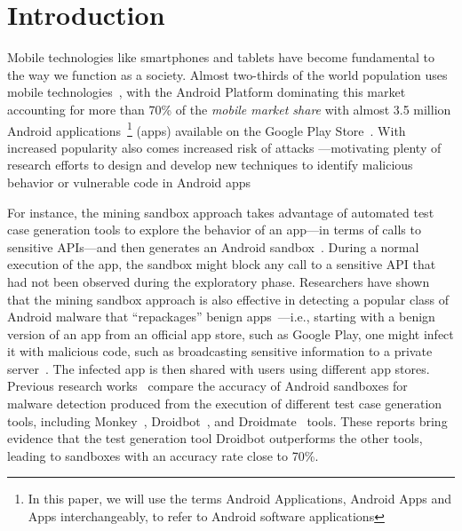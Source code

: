 \section{Introduction}\label{sec:introduction}

Mobile technologies like smartphones and tablets have become fundamental to the way we function as a society. Almost two-thirds of the world population
uses mobile technologies~\cite{Comscore,DBLP:journals/tse/MartinSJZH17}, with the
Android Platform dominating this market accounting for more than 70\% of the \emph{mobile
market share} with almost 3.5 million Android applications~\footnote{In this paper, we will use the terms Android Applications, Android Apps and Apps interchangeably, to refer to Android software applications} (apps)
available on the Google Play Store~\cite{Statista}. 
With increased popularity also comes increased risk of attacks ---motivating plenty of research efforts to design and develop new techniques
to identify malicious behavior or vulnerable code in Android apps~\cite{DBLP:conf/msr/SamhiBK22} 

For instance, the
mining sandbox approach takes advantage of automated test case generation tools 
to explore the behavior of an app---in terms of calls to sensitive APIs---and then
generates an Android sandbox~\cite{DBLP:conf/icse/JamrozikSZ16}. During a normal
execution of the app, the sandbox might block any call to a sensitive API
that had not been observed during the exploratory phase. 
Researchers have shown that the mining sandbox approach is also effective
in detecting a popular class of Android malware that ``repackages'' benign apps~\cite{DBLP:conf/wcre/BaoLL18,le2018towards}---i.e., starting with a benign version of an app from an official app store, such as Google Play, one might infect it with
malicious code, such as broadcasting
sensitive information to a private server~\cite{DBLP:journals/tse/LiBK21}. The infected app is then
shared with users using different app stores. 
Previous research works~\cite{DBLP:conf/wcre/BaoLL18,DBLP:journals/jss/CostaMMSSBNR22} compare the accuracy of Android sandboxes for malware detection 
produced from the execution of different test case generation tools, including Monkey~\cite{Monkey}, Droidbot~\cite{DBLP:conf/icse/LiYGC17}, and Droidmate~\cite{DBLP:conf/kbse/BorgesHZ18} tools.
These reports bring evidence that the test generation tool Droidbot outperforms the other tools, leading to sandboxes with an accuracy
rate close to 70\%. 

